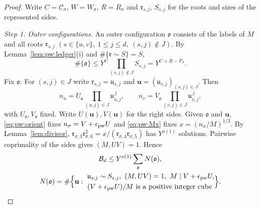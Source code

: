 \documentclass{amsart}
\theoremstyle{definition}
\theoremstyle{plain}
\numberwithin{equation}{section}
\numberwithin{table}{section}
\begin{document}
\begin{proof}
Write $C=\mathcal C_\sigma$, $W=W_\sigma$, $R=R_\sigma$ and $\mathfrak r_{s,j}$,
$S_{s,j}$ for the roots and sizes of the represented sides.

\emph{Step 1. Outer configurations.} An outer configuration $\mathfrak o$
consists of the labels of $M$ and all roots $\mathfrak r_{s,j}$ $(s\in\{u,v\},\
1\le j\le d,\ (s,j)\notin J)$. By Lemma~\ref{lem:pw:ledger}(i) and
$\#\{\mathfrak r\sim S\}=S$,
\begin{equation}\label{eq:pw:nout}
 \#\{\mathfrak o\}\le Y^{C}\prod_{(s,j)\notin J}S_{s,j}=Y^{C+R-P_J}.
\end{equation}
Fix $\mathfrak o$. For $(s,j)\in J$ write $\mathfrak r_{s,j}=\mathfrak u_{s,j}$
and $\mathbf u=(\mathfrak u_{s,j})_{(s,j)\in J}$. Then
\begin{equation}\label{eq:pw:UV}
 n_u=U_{\mathfrak o}\prod_{(u,j)\in J}\mathfrak u_{u,j}^{\,j},\qquad
 n_v=V_{\mathfrak o}\prod_{(v,j)\in J}\mathfrak u_{v,j}^{\,j},
\end{equation}
with $U_{\mathfrak o},V_{\mathfrak o}$ fixed. Write $U(\mathbf u),V(\mathbf u)$
for the right sides. Given $\mathfrak o$ and $\mathbf u$,
\eqref{eq:pw:orient} fixes $n_\sigma=V+\epsilon_{\rm pw} U$ and \eqref{eq:pw:Mx}
fixes $x=(n_\sigma/M)^{1/3}$. By Lemma~\ref{lem:divisor},
$\mathfrak r_{\sigma,3}\mathfrak r_{\sigma,6}^2=x/(\mathfrak r_{\sigma,4}\mathfrak r_{\sigma,5})$
has $Y^{o(1)}$ solutions. Pairwise coprimality of
the sides gives $(M,UV)=1$. Hence
\begin{equation}\label{eq:pw:step1}
 \begin{gathered}
 \mathcal B_d\le Y^{o(1)}\sum_{\mathfrak o}N(\mathfrak o),\\
 N(\mathfrak o)=\#\Bigl\{\mathbf u:\
 \begin{aligned}
 &\mathfrak u_{s,j}\sim S_{s,j},\ (M,UV)=1,\ M\mid V+\epsilon_{\rm pw} U,\\
 &(V+\epsilon_{\rm pw} U)/M\ \text{is a positive integer cube}
 \end{aligned}\Bigr\}.
 \end{gathered}
\end{equation}


\end{proof}
\end{document}
